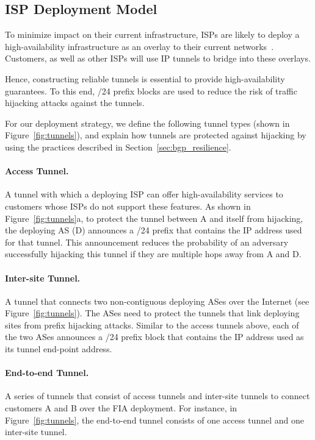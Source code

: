 \subsection{ISP Deployment Model}
\label{ssec:deployment_model}

To minimize impact on their current infrastructure, ISPs are likely to deploy a
high-availability infrastructure as an overlay to their current
networks~\cite{peterson2003blueprint}. Customers, as well as other ISPs will
use IP tunnels to bridge into these overlays. 

Hence, constructing reliable tunnels is essential to provide high-availability
guarantees. To this end, /24 prefix blocks are used to reduce the risk of
traffic hijacking attacks against the tunnels. 

For our deployment strategy, we define the following tunnel types (shown in
Figure~\ref{fig:tunnels}), and explain how tunnels are protected against
hijacking by using the practices described in Section~\ref{sec:bgp_resilience}.

\paragraph{Access Tunnel.} A tunnel with which a deploying ISP can offer
high-availability services to customers whose ISPs do not support these
features. As shown in Figure~\ref{fig:tunnels}a, to protect the tunnel between
A and itself from hijacking, the deploying AS (D) announces a /24 prefix
that  contains the IP address used for that tunnel. This announcement reduces
the probability of an adversary successfully hijacking this tunnel if they are
multiple hops away from A and D.

\paragraph{Inter-site Tunnel.} A tunnel that connects two non-contiguous
deploying ASes over the Internet (see Figure~\ref{fig:tunnels}). The ASes need
to protect the tunnels that link deploying sites from prefix hijacking attacks.
Similar to the access tunnels above, each of the two ASes announces a /24
prefix block that contains the IP address used as its tunnel end-point address. 

\paragraph{End-to-end Tunnel.} A series of tunnels that consist of access
tunnels and inter-site tunnels to connect customers A and B over the FIA
deployment. For instance, in Figure~\ref{fig:tunnels}, the end-to-end tunnel
consists of one access tunnel and one inter-site tunnel.

